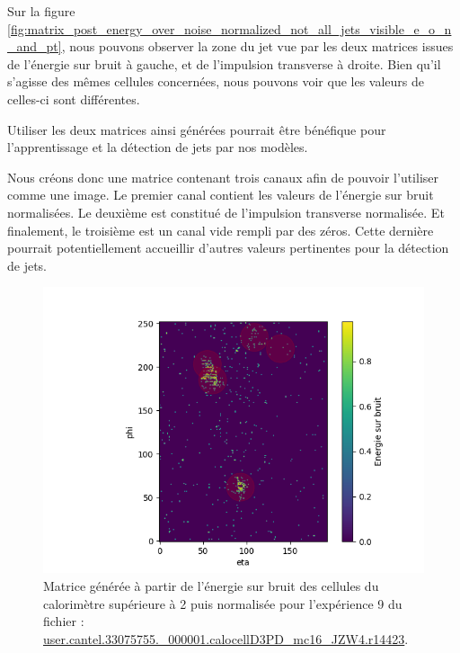 Sur la figure \ref{fig:matrix_post_energy_over_noise_normalized_not_all_jets_visible_e_o_n_and_pt}, nous pouvons observer la zone du jet vue par les deux matrices issues de l'énergie sur bruit à gauche, et de l'impulsion transverse à droite. Bien qu'il s'agisse des mêmes cellules concernées, nous pouvons voir que les valeurs de celles-ci sont différentes.

Utiliser les deux matrices ainsi générées pourrait être bénéfique pour l'apprentissage et la détection de jets par nos modèles.

Nous créons donc une matrice contenant trois canaux afin de pouvoir l'utiliser comme une image. Le premier canal contient les valeurs de l'énergie sur bruit normalisées. Le deuxième est constitué de l'impulsion transverse normalisée. Et finalement, le troisième est un canal vide rempli par des zéros. Cette dernière pourrait potentiellement accueillir d'autres valeurs pertinentes pour la détection de jets. 

\begin{figure}[hbt!]
    \centering
    \includegraphics[scale=0.7]{Figures/dataset/matrix_post_energy_over_noise_normalized_not_all_jets_visible.png}
    \caption{Matrice générée à partir de l'énergie sur bruit des cellules du calorimètre supérieure à 2 puis normalisée pour l'expérience 9 du fichier : \url{user.cantel.33075755.\_000001.calocellD3PD\_mc16\_JZW4.r14423}.}
    \label{fig:matrix_post_energy_over_noise_normalized_not_all_jets_visible}
\end{figure}

